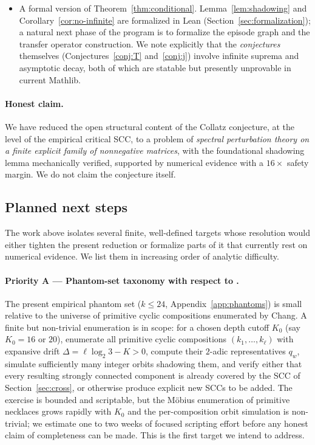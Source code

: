 \documentclass[11pt,a4paper]{article}
\theoremstyle{definition}
\begin{document}
\begin{itemize}
        in Section~\ref{sec:cross} is, strictly, a working
        hypothesis.
  \item A formal version of Theorem~\ref{thm:conditional}.
        Lemma~\ref{lem:shadowing} and Corollary~\ref{cor:no-infinite}
        are formalized in Lean (Section~\ref{sec:formalization}); a
        natural next phase of the program is to formalize the
        episode graph and the transfer operator construction. We
        note explicitly that the \emph{conjectures} themselves
        (Conjectures~\ref{conj:T} and~\ref{conj:j}) involve
        infinite suprema and asymptotic decay, both of which are
        statable but presently unprovable in current Mathlib.
\end{itemize}

\paragraph{Honest claim.}
We have reduced the open structural content of the Collatz
conjecture, at the level of the empirical critical SCC, to a
problem of \emph{spectral perturbation theory on a finite explicit
family of nonnegative matrices}, with the foundational shadowing
lemma mechanically verified, supported by numerical evidence with
a $16\times$ safety margin. We do not claim the conjecture itself.

\subsection{Planned next steps}
\label{sec:planned}

The work above isolates several finite, well-defined targets
whose resolution would either tighten the present reduction or
formalize parts of it that currently rest on numerical evidence.
We list them in increasing order of analytic difficulty.

\paragraph{Priority A --- Phantom-set taxonomy with respect to
\cite[Theorem~7.15]{chang2026}.}
The present empirical phantom set ($k \le 24$,
Appendix~\ref{app:phantoms}) is small relative to the universe of
primitive cyclic compositions enumerated by Chang. A finite but
non-trivial enumeration is in scope: for a chosen depth cutoff
$K_0$ (say $K_0 = 16$ or $20$), enumerate all primitive cyclic
compositions $(k_1, \ldots, k_\ell)$ with expansive drift
$\Delta = \ell \log_2 3 - K > 0$, compute their $2$-adic
representatives $q_w$, simulate sufficiently many integer orbits
shadowing them, and verify either that every resulting
strongly connected component is already covered by the SCC of
Section~\ref{sec:cross}, or otherwise produce explicit new SCCs
to be added. The exercise is bounded and scriptable, but the
M\"obius enumeration of primitive necklaces grows rapidly with
$K_0$ and the per-composition orbit simulation is non-trivial; we
estimate one to two weeks of focused scripting effort before any
honest claim of completeness can be made. This is the first
target we intend to address.
\end{document}
